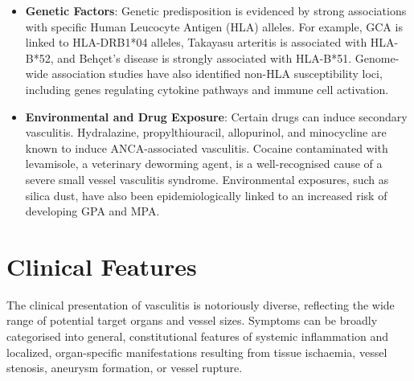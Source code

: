 \begin{itemize}
\item \textbf{Genetic Factors}: Genetic predisposition is evidenced by strong associations with specific Human Leucocyte Antigen (HLA) alleles. For example, GCA is linked to HLA-DRB1*04 alleles, Takayasu arteritis is associated with HLA-B*52, and Beh\c{c}et's disease is strongly associated with HLA-B*51. Genome-wide association studies have also identified non-HLA susceptibility loci, including genes regulating cytokine pathways and immune cell activation.
\item \textbf{Environmental and Drug Exposure}: Certain drugs can induce secondary vasculitis. Hydralazine, propylthiouracil, allopurinol, and minocycline are known to induce ANCA-associated vasculitis. Cocaine contaminated with levamisole, a veterinary deworming agent, is a well-recognised cause of a severe small vessel vasculitis syndrome. Environmental exposures, such as silica dust, have also been epidemiologically linked to an increased risk of developing GPA and MPA.
\end{itemize}

\section*{Clinical Features}
The clinical presentation of vasculitis is notoriously diverse, reflecting the wide range of potential target organs and vessel sizes. Symptoms can be broadly categorised into general, constitutional features of systemic inflammation and localized, organ-specific manifestations resulting from tissue ischaemia, vessel stenosis, aneurysm formation, or vessel rupture.

